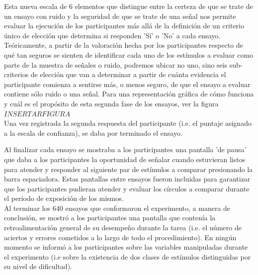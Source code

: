 \begin{itemize}
Esta nueva escala de 6 elementos que distingue entre la certeza de que se trate de un ensayo con ruido y la seguridad de que se trate de una señal nos permite evaluar la ejecución de los participantes más allá de la definición de un criterio único de elección que determina si responden 'Sí' o 'No' a cada ensayo. Teóricamente, a partir de la valoración hecha por los participantes respecto de qué tan seguros se sienten de identificar cada uno de los estímulos a evaluar como parte de la muestra de señales o ruido, podremos ubicar no uno, sino seis sub-criterios de elección que van a determinar a partir de cuánta evidencia el participante comienza a sentirse más, o menos seguro, de que el ensayo a evaluar contiene sólo ruido o una señal. Para una representación gráfica de cómo funciona y cuál es el propósito de esta segunda fase de los ensayos, ver la figura $ INSERTAR FIGURA $\\

Una vez registrada la segunda respuesta del participante (i.e. el puntaje asignado a la escala de confianza), se daba por terminado el ensayo.\\

\end{itemize}

Al finalizar cada ensayo se mostraba a los participantes una pantalla 'de pausa' que daba a los participantes la oportunidad de señalar cuando estuvieran listos para atender y responder al siguiente par de estímulos a comparar presionando la barra espaciadora. Estas pantallas entre ensayos fueron incluidas para garantizar que los participantes pudieran atender y evaluar los círculos a comparar durante el periodo de exposición de los mismos.\\

Al terminar los 640 ensayos que conformaron el experimento, a manera de conclusión, se mostró a los participantes una pantalla que contenía la retroalimentación general de su desempeño durante la tarea (i.e. el número de aciertos y errores cometidos a lo largo de todo el procedimiento). En ningún momento se informó a los participantes sobre las variables manipuladas durante el experimento (i.e sobre la existencia de dos clases de estímulos distinguidas por su nivel de dificultad).\\ 

